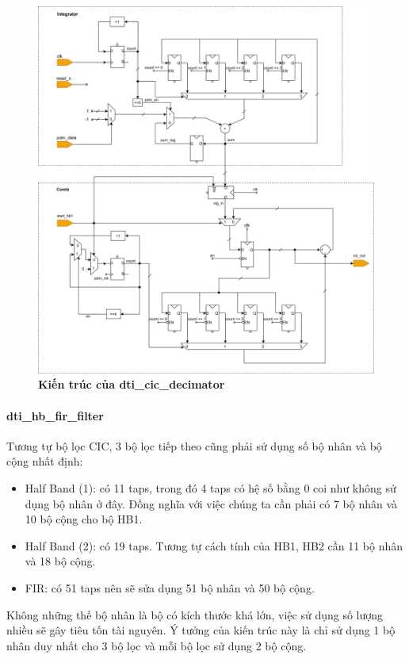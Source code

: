 \begin{figure}[H]
    \centering
    \includegraphics[width=16cm]{Images/Chuong4/cic/cic_top_arc.png}
    \caption[Kiến trúc của dti\_cic\_decimator]{\bfseries \fontsize{12pt}{0pt}\selectfont Kiến trúc của dti\_cic\_decimator}
    \label{cic_top_arc}
\end{figure}
 \paragraph{dti\_hb\_fir\_filter}
Tương tự bộ lọc CIC, 3 bộ lọc tiếp theo cũng phải sử dụng số bộ nhân và bộ cộng nhất định:
\begin{itemize}
    \item Half Band (1): có 11 taps, trong đó 4 taps có hệ số bằng 0 coi như không sử dụng bộ nhân ở đây. Đồng nghĩa với việc chúng ta cần phải có 7 bộ nhân và 10 bộ cộng cho bộ HB1.
     \item Half Band (2): có 19 taps. Tương tự cách tính của HB1, HB2 cần 11 bộ nhân và 18 bộ cộng.
     \item FIR: có 51 taps nên sẽ sửa dụng 51 bộ nhân và 50 bộ cộng.
\end{itemize} 

Không những thế bộ nhân là bộ có kích thước khá lớn, việc sử dụng số lượng nhiều sẽ gây tiêu tốn tài nguyên. Ý tưởng của kiến trúc này là chỉ sử dụng 1 bộ nhân duy nhất cho 3 bộ lọc và mỗi bộ lọc sử dụng 2 bộ cộng.

